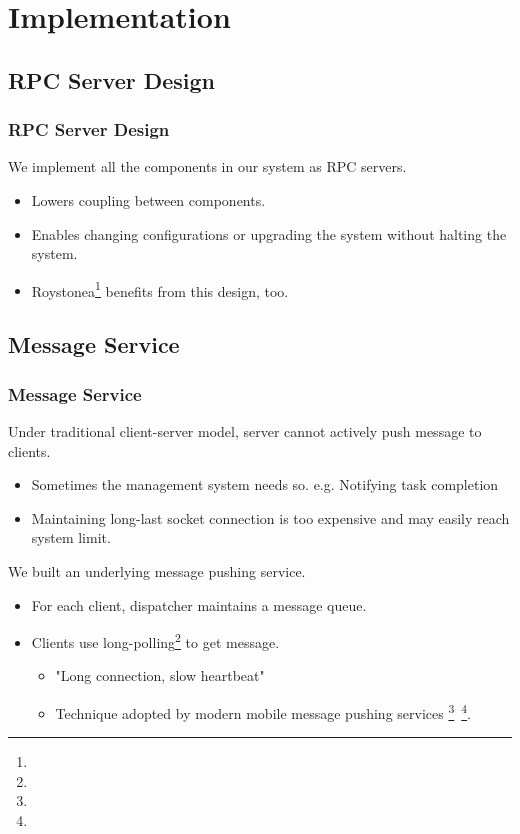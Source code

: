 \section{Implementation}
\subsection{RPC Server Design}
\begin{frame}
  \frametitle{RPC Server Design}
  We implement all the components in our system as RPC servers.
  \begin{itemize}
    \item Lowers coupling between components.
    \item Enables changing configurations or upgrading the system
      without halting the system.
    \item Roystonea\footnote[frame]{\tiny{}}
      benefits from this design, too.
  \end{itemize}
\end{frame}
\subsection{Message Service}
\begin{frame}
  \frametitle{Message Service}
  Under traditional client-server model, server cannot actively push
  message to clients.
  \begin{itemize}
    \item Sometimes the management system needs so.
      e.g. Notifying task completion
    \item Maintaining long-last socket connection is too expensive and
      may easily reach system limit.
  \end{itemize}
  We built an underlying message pushing service.
  \begin{itemize}
    \item For each client, dispatcher maintains a message queue.
    \item Clients use long-polling\footnote[frame]{\tiny{}} to get message.
      \begin{itemize}
        \item "Long connection, slow heartbeat"
        \item Technique adopted by modern mobile message pushing services
          \footnote[frame]{\tiny{}}~\footnote[frame]{\tiny{}}.
      \end{itemize}
  \end{itemize}
\end{frame}
